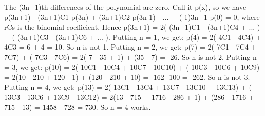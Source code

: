 \begin{enumerate}
The (3n+1)th differences of the polynomial are zero. Call it p(x), so we have p(3n+1) - (3n+1)C1 p(3n) + (3n+1)C2 p(3n-1) - ... + (-1)3n+1 p(0) = 0, where rCs is the binomial coefficient. Hence p(3n+1) = 2( (3n+1)C1 - (3n+1)C4 + ... ) + ( (3n+1)C3 - (3n+1)C6 + ... ). Putting n = 1, we get: p(4) = 2( 4C1 - 4C4) + 4C3 = 6 + 4 = 10. So n is not 1. Putting n = 2, we get: p(7) = 2( 7C1 - 7C4 + 7C7) + ( 7C3 - 7C6) = 2( 7 - 35 + 1) + (35 - 7) = -26. So n is not 2. Putting n = 3, we get: p(10) = 2( 10C1 - 10C4 + 10C7 - 10C10) + ( 10C3 - 10C6 + 10C9) = 2(10 - 210 + 120 - 1) + (120 - 210 + 10) = -162 -100 = -262. So n is not 3. Putting n = 4, we get: p(13) = 2( 13C1 - 13C4 + 13C7 - 13C10 + 13C13) + ( 13C3 - 13C6 + 13C9 - 13C12) = 2(13 - 715 + 1716 - 286 + 1) + (286 - 1716 + 715 - 13) = 1458 - 728 = 730. So n = 4 works.

 


\end{enumerate}